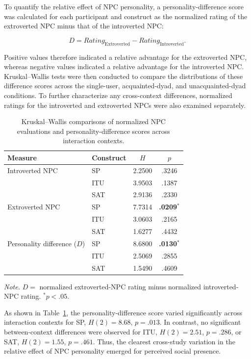 \documentclass[a4paper,fleqn]{cas-sc}
\begin{document}
To quantify the relative effect of NPC personality, a personality-difference score was calculated for each participant and construct as the normalized rating of the extroverted NPC minus that of the introverted NPC:

\[
D = Rating_{\mathrm{Extroverted}} - Rating_{\mathrm{Introverted}}.
\]

Positive values therefore indicated a relative advantage for the extroverted NPC, whereas negative values indicated a relative advantage for the introverted NPC. Kruskal--Wallis tests were then conducted to compare the distributions of these difference scores across the single-user, acquainted-dyad, and unacquainted-dyad conditions. To further characterize any cross-context differences, normalized ratings for the introverted and extroverted NPCs were also examined separately.

\begin{table}[t]
\centering
\caption{Kruskal--Wallis comparisons of normalized NPC evaluations and personality-difference scores across interaction contexts.}
\label{tab:cross_study_kw}
\begin{tabular}{llcc}
\toprule
\textbf{Measure} & \textbf{Construct} & \textbf{$H$} & \textbf{$p$} \\
\midrule
Introverted NPC
    & SP  & 2.2500 & .3246 \\
    & ITU & 3.9503 & .1387 \\
    & SAT & 2.9136 & .2330 \\
\addlinespace
Extroverted NPC
    & SP  & 7.7314 & \textbf{.0209}$^{*}$ \\
    & ITU & 3.0603 & .2165 \\
    & SAT & 1.6277 & .4432 \\
\addlinespace
Personality difference ($D$)
    & SP  & 8.6800 & \textbf{.0130}$^{*}$ \\
    & ITU & 2.5069 & .2855 \\
    & SAT & 1.5490 & .4609 \\
\bottomrule
\end{tabular}

\vspace{1mm}
\begin{minipage}{0.95\linewidth}
\footnotesize
\textit{Note.} $D =$ normalized extroverted-NPC rating minus normalized introverted-NPC rating. 
$^{*}p < .05$.
\end{minipage}
\end{table}

As shown in Table~\ref{tab:cross_study_kw}, the personality-difference score varied significantly across interaction contexts for SP, $H(2)=8.68$, $p=.013$. In contrast, no significant between-context differences were observed for ITU, $H(2)=2.51$, $p=.286$, or SAT, $H(2)=1.55$, $p=.461$. Thus, the clearest cross-study variation in the relative effect of NPC personality emerged for perceived social presence.
\end{document}
